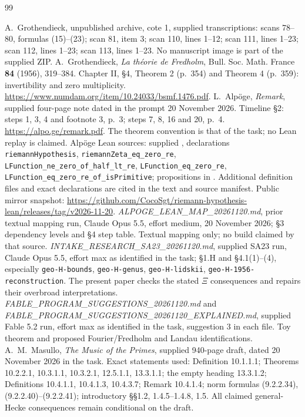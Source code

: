 \begin{thebibliography}{99}\raggedright
{} A.~Grothendieck, unpublished archive, cote 1, supplied transcriptions: scans 78--80, formulas (15)--(23); scan 81, item 3; scan 110, lines 1--12; scan 111, lines 1--23; scan 112, lines 1--23; scan 113, lines 1--23. No manuscript image is part of the supplied ZIP.
 A.~Grothendieck, \emph{La th\'eorie de Fredholm}, Bull. Soc. Math. France \textbf{84} (1956), 319--384. Chapter II, \S4, Theorem 2 (p.~354) and Theorem 4 (p.~359): invertibility and zero multiplicity. \url{https://www.numdam.org/item/10.24033/bsmf.1476.pdf}.
 L.~Alp\"oge, \emph{Remark}, supplied four-page note dated in the prompt 20 November 2026. Timeline \S2: steps 1, 3, 4 and footnote 3, p.~3; steps 7, 8, 16 and 20, p.~4. \url{https://alpo.ge/remark.pdf}. The theorem convention is that of the task; no Lean replay is claimed.
 Alp\"oge Lean sources: supplied , declarations \texttt{riemannHypothesis}, \texttt{riemannZeta\_eq\_zero\_re}, \texttt{LFunction\_ne\_zero\_of\_half\_lt\_re}, \texttt{LFunction\_eq\_zero\_re}, \texttt{LFunction\_eq\_zero\_re\_of\_isPrimitive}; propositions in . Additional definition files and exact declarations are cited in the text and source manifest. Public mirror snapshot: \url{https://github.com/CocoSgt/riemann-hypothesis-lean/releases/tag/v2026-11-20}.
 \emph{ALPOGE\_LEAN\_MAP\_20261120.md}, prior textual mapping run, Claude Opus 5.5, effort medium, 20 November 2026; \S3 dependency levels and \S4 step table. Textual mapping only; no build claimed by that source.
 \emph{INTAKE\_RESEARCH\_SA23\_20261120.md}, supplied SA23 run, Claude Opus 5.5, effort max as identified in the task; \S1.H and \S4.1(1)--(4), especially \texttt{geo-H-bounds}, \texttt{geo-H-genus}, \texttt{geo-H-lidskii}, \texttt{geo-H-1956-reconstruction}. The present paper checks the stated $\Xi$ consequences and repairs their overbroad interpretations.
 \emph{FABLE\_PROGRAM\_SUGGESTIONS\_20261120.md} and \emph{FABLE\_PROGRAM\_SUGGESTIONS\_20261120\_EXPLAINED.md}, supplied Fable 5.2 run, effort max as identified in the task, suggestion 3 in each file. Toy theorem and proposed Fourier/Fredholm and Landau identifications.
 A.~M.~Masullo, \emph{The Music of the Primes}, supplied 940-page draft, dated 20 November 2026 in the task. Exact statements used: Definition 10.1.1.1; Theorems 10.2.2.1, 10.3.1.1, 10.3.2.1, 12.5.1.1, 13.3.1.1; the empty heading 13.3.1.2; Definitions 10.4.1.1, 10.4.1.3, 10.4.3.7; Remark 10.4.1.4; norm formulas (9.2.2.34), (9.2.2.40)--(9.2.2.41); introductory \S\S1.2, 1.4.5--1.4.8, 1.5. All claimed general-Hecke consequences remain conditional on the draft.

\end{thebibliography}
